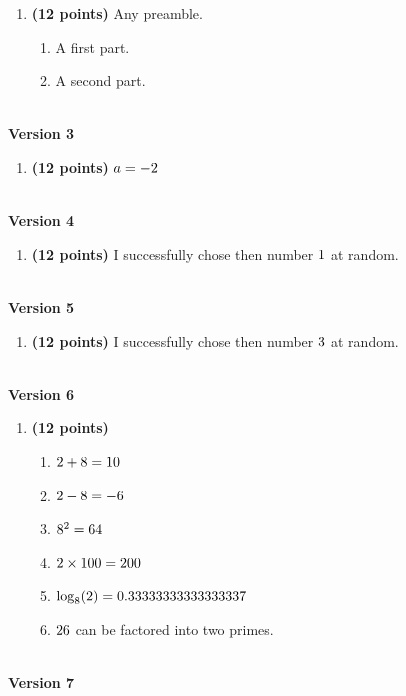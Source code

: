\documentclass[12pt]{amsart}
\begin{document}
\begin{enumerate}[resume]
\item {\bf (12 points)} 
 Any preamble. \begin{enumerate}
\item A first part. \vspace{2cm}
\item A second part.
\end{enumerate}

\vfill 
 \end{enumerate}$ $ \\ {\bf Version 3} \\\begin{enumerate}[resume]
\item {\bf (12 points)} 
 $a = -2$ 
\vfill 
 \end{enumerate}$ $ \\ {\bf Version 4} \\\begin{enumerate}[resume]
\item {\bf (12 points)} 
  I successfully chose then number $1$ at random. 
\vfill 
 \end{enumerate}$ $ \\ {\bf Version 5} \\\begin{enumerate}[resume]
\item {\bf (12 points)} 
 I successfully chose then number $3$ at random. 
\vfill 
 \end{enumerate}$ $ \\ {\bf Version 6} \\\begin{enumerate}[resume]
\item {\bf (12 points)} 
 \begin{enumerate}
\item $2 + 8 = 10$
\item $2 - 8 = -6$
\item $8^{2} = 64$
\item $2 \times 100 = 200$
\item $\log_{8}(2) = 0.33333333333333337$
\item $26$ can be factored into two primes.
\end{enumerate} 
\vfill 
 \end{enumerate}$ $ \\ {\bf Version 7} \\\begin{enumerate}[resume]

\end{enumerate}
\end{document}
